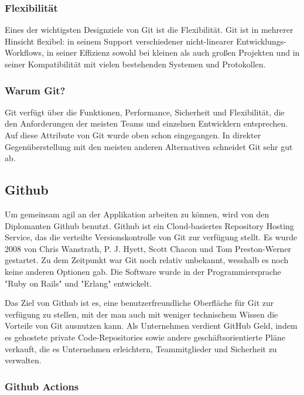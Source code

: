 \subsubsection{Flexibilität}

Eines der wichtigsten Designziele von Git ist die Flexibilität. Git ist in mehrerer Hinsicht flexibel: in seinem Support verschiedener nicht-linearer Entwicklungs-Workflows, 
in seiner Effizienz sowohl bei kleinen als auch großen Projekten und in seiner Kompatibilität mit vielen bestehenden Systemen und Protokollen.
\cite{sysarch-git-1}

\subsubsection{Warum Git?}

Git verfügt über die Funktionen, Performance, Sicherheit und Flexibilität, die den Anforderungen der meisten Teams und einzelnen Entwicklern entsprechen. 
Auf diese Attribute von Git wurde oben schon eingegangen. In direkter Gegenüberstellung mit den meisten anderen Alternativen schneidet Git sehr gut ab.
\cite{sysarch-git-1}

\subsection{Github}

Um gemeinsam agil an der Applikation arbeiten zu können, wird von den Diplomanten Github benutzt.
Github ist ein Cloud-basiertes Repository Hosting Service, das die verteilte Versionskontrolle von Git zur verfügung stellt. Es wurde 2008 von Chris Wanstrath, P. J. Hyett, 
Scott Chacon und Tom Preston-Werner gestartet. Zu dem Zeitpunkt war Git noch relativ unbekannt, wesshalb es noch keine anderen Optionen gab. Die Software wurde in der 
Programmiersprache "Ruby on Rails" und "Erlang" entwickelt. 
\cite{sysarch-github-1}

Das Ziel von Github ist es, eine benutzerfreundliche Oberfläche für Git zur verfügung zu stellen, mit der man auch mit weniger technischem Wissen die Vorteile von Git ausnutzen kann.
Als Unternehmen verdient GitHub Geld, indem es gehostete private Code-Repositories sowie andere geschäftsorientierte Pläne verkauft, 
die es Unternehmen erleichtern, Teammitglieder und Sicherheit zu verwalten.
\cite{sysarch-github-2}

\subsubsection{Github Actions}

